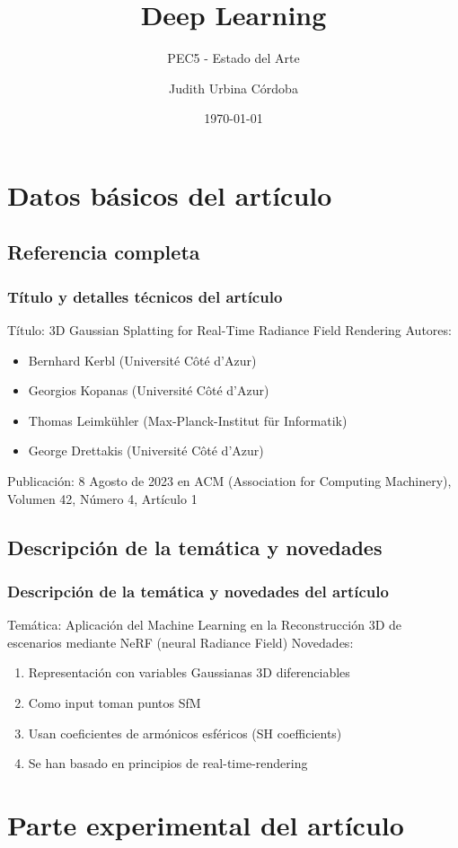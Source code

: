 \documentclass{beamer}
\title{Deep Learning}
\subtitle{PEC5 - Estado del Arte}
\author{Judith Urbina Córdoba}
\institute{UOC}
\date{\today}
\begin{document}
\begin{frame}
    \titlepage
\end{frame}

\section{Datos básicos del artículo}
\subsection{Referencia completa}
\begin{frame}
    \frametitle{Título y detalles técnicos del artículo}
    Título: 3D Gaussian Splatting for Real-Time Radiance Field Rendering
    Autores: \begin{itemize}
        \item  Bernhard Kerbl (Université Côté d'Azur)
        \item Georgios Kopanas (Université Côté d'Azur)
        \item Thomas Leimkühler (Max-Planck-Institut für Informatik)
        \item George Drettakis (Université Côté d'Azur)
    \end{itemize}
    Publicación: 8 Agosto de 2023 en ACM (Association for Computing Machinery), Volumen 42, Número 4, Artículo 1
\end{frame}

\subsection{Descripción de la temática y novedades}
\begin{frame}
    \frametitle{Descripción de la temática y novedades del artículo}
    Temática: Aplicación del Machine Learning en la Reconstrucción 3D de escenarios mediante NeRF (neural Radiance Field)
    Novedades:
   \begin{enumerate}[I]
        \item Representación con variables Gaussianas 3D diferenciables
        \item Como input toman puntos SfM
       \item Usan coeficientes de armónicos esféricos (SH coefficients)
       \item Se han basado en principios de real-time-rendering
   \end{enumerate}
\end{frame}

\section{Parte experimental del artículo}
\end{document}

